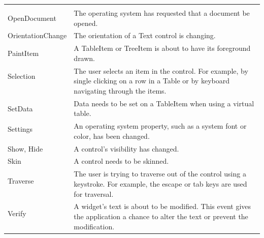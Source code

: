 \begin{center}
\begin{tabular}{l|l}
&\\
OpenDocument & The operating system has requested that a document be opened.\\
OrientationChange & The orientation of a Text control is changing.\\
PaintItem & A TableItem or TreeItem is about to have its foreground drawn.\\
Selection & \multirow{3}{*}{\parbox{12cm}{The user selects an item in the control. For example, by single clicking on a row in a Table or by keyboard navigating through the items.}}\\
&\\
&\\
SetData & Data needs to be set on a TableItem when using a virtual table.\\
Settings & \multirow{2}{*}{\parbox{12cm}{An operating system property, such as a system font or color, has been changed.}}\\
&\\
Show, Hide & A control's visibility has changed.\\
Skin & A control needs to be skinned.\\
Traverse & \multirow{2}{*}{\parbox{12cm}{The user is trying to traverse out of the control using a keystroke. For example, the escape or tab keys are used for traversal.}}\\
&\\
Verify & \multirow{2}{*}{\parbox{12cm}{A widget's text is about to be modified. This event gives the application a chance to alter the text or prevent the modification.}}\\
&\\
\end{tabular}
\end{center}

\newpage
\printbibliography
